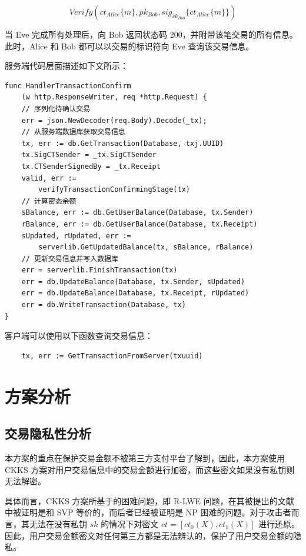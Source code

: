 \begin{equation} \label{eq:Verify_2}
    Verify(ct_{Alice}\{m\}, pk_{Bob}, sig_{sk_{Bob}}\{ct_{Alice}\{m\}\})
\end{equation}

当 Eve 完成所有处理后，向 Bob 返回状态码 200，并附带该笔交易的所有信息。此时，Alice 和 Bob 都可以以交易的标识符向 Eve 查询该交易信息。

服务端代码层面描述如下文所示：

\begin{verbatim}
func HandlerTransactionConfirm
    (w http.ResponseWriter, req *http.Request) {
    // 序列化待确认交易
    err = json.NewDecoder(req.Body).Decode(_tx);
    // 从服务端数据库获取交易信息
    tx, err := db.GetTransaction(Database, txj.UUID)
    tx.SigCTSender = _tx.SigCTSender
    tx.CTSenderSignedBy = _tx.Receipt
    valid, err := 
        verifyTransactionConfirmingStage(tx)
    // 计算密态余额
    sBalance, err := db.GetUserBalance(Database, tx.Sender)
    rBalance, err := db.GetUserBalance(Database, tx.Receipt)
    sUpdated, rUpdated, err := 
        serverlib.GetUpdatedBalance(tx, sBalance, rBalance)
    // 更新交易信息并写入数据库
    err = serverlib.FinishTransaction(tx)
    err = db.UpdateBalance(Database, tx.Sender, sUpdated)
    err = db.UpdateBalance(Database, tx.Receipt, rUpdated)
    err = db.WriteTransaction(Database, tx)
}
\end{verbatim}

客户端可以使用以下函数查询交易信息：

\begin{verbatim}
    tx, err := GetTransactionFromServer(txuuid)
\end{verbatim}

\section{方案分析}

\subsection{交易隐私性分析}

本方案的重点在保护交易金额不被第三方支付平台了解到，因此，本方案使用 CKKS 方案对用户交易信息中的交易金额进行加密，而这些密文如果没有私钥则无法解密。

具体而言，CKKS 方案所基于的困难问题，即 R-LWE 问题，在其被提出的文献\cite{cryptoeprint:2012/230}中被证明是和 SVP 等价的，而后者已经被证明是 NP 困难的问题\cite{10.1145/276698.276705}。对于攻击者而言，其无法在没有私钥 $sk$ 的情况下对密文 $ct = [ct_0(X), ct_1(X)]$ 进行还原。因此，用户交易金额密文对任何第三方都是无法辨认的，保护了用户交易金额的隐私。

